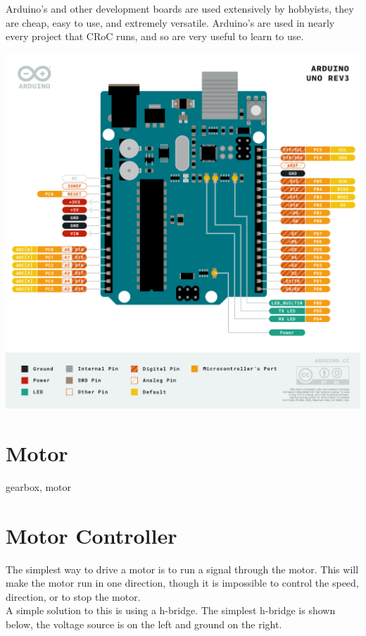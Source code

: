\documentclass[a4paper,12pt]{article}
\begin{document}
Arduino's and other development boards are used extensively by hobbyists, they are cheap, easy to use, and extremely versatile. Arduino's are used in nearly every project that CRoC runs, and so are very useful to learn to use. 


\begin{center}
    \includegraphics[width=0.8\linewidth]{Pinout-UNOrev3_latest.png}
    \label{fig:arduino-pinout}
\end{center}





\section{Motor}
gearbox, motor

\pagebreak
\section{Motor Controller}

The simplest way to drive a motor is to run a signal through the motor. This will make the motor run in one direction, though it is impossible to control the speed, direction, or to stop the motor. \\

A simple solution to this is using a h-bridge. The simplest h-bridge is shown below, the voltage source is on the left and ground on the right. 
\end{document}
